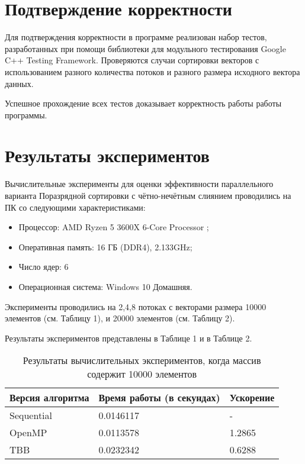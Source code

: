 \documentclass{report}
\begin{document}
\newpage

\section*{Подтверждение корректности}
Для подтверждения корректности в программе реализован набор тестов, разработанных при помощи библиотеки для модульного тестирования Google C++ Testing Framework. Проверяются случаи сортировки векторов с использованием разного количества потоков и разного размера исходного вектора данных.
\par Успешное прохождение всех тестов доказывает корректность работы работы программы.

\newpage

\section*{Результаты экспериментов}
Вычислительные эксперименты для оценки эффективности параллельного варианта
Поразрядной сортировки с чётно-нечётным слиянием проводились на ПК со следующими характеристиками:
\begin{itemize}
\item Процессор: AMD Ryzen 5 3600X 6-Core Processor ;
\item Оперативная память: 16 ГБ (DDR4), 2.133GHz;
\item Число ядер: 6
\item Операционная система: Windows 10 Домашняя.
\end{itemize}

\par Эксперименты проводились на 2,4,8 потоках с векторами размера 10000 элементов (см. Таблицу 1), и 20000 элементов (см. Таблицу 2).

\par Результаты экспериментов представлены в Таблице 1 и в Таблице 2.

\begin{table}[!h]
\caption{Результаты вычислительных экспериментов, когда массив содержит 10000 элементов}
\centering
\begin{tabular}{| p{2cm} | p{3cm} | p{4cm} |}
\hline
Версия алгоритма & Время работы (в секундах) & Ускорение  \\[5pt]
\hline
Sequential        & 0.0146117       & -         \\
OpenMP        & 0.0113578        & 1.2865          \\
TBB       & 0.0232342        &  0.6288        \\


\hline
\end{tabular}
\end{table}
\end{document}
